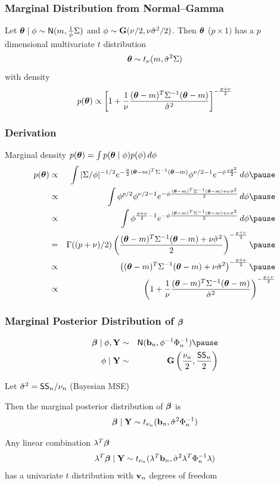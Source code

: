 \documentclass[handout]{beamer}
\begin{document}
\begin{frame}
  \frametitle{Marginal Distribution from Normal--Gamma }
  \begin{theorem}
    Let  $\boldsymbol{\theta} \mid \phi \sim \textsf{N}(m, \frac{1}{\phi} \Sigma)$ and $\phi \sim
    \mathbf{G}(\nu/2, \nu {\hat{\sigma}}^2/2)$. Then  $\boldsymbol{\theta}$ ($p \times 1)$ has a $p$
    dimensional multivariate $t$ distribution $$\boldsymbol{\theta} \sim t_\nu( m,
    {\hat{\sigma}}^2 \Sigma )$$ with density
$$p(\boldsymbol{\theta}) \propto  \left[ 1 + \frac{1}{\nu}  \frac{ (\boldsymbol{\theta} - m)^T
    \Sigma^{-1} (\boldsymbol{\theta} - m)}{{\hat{\sigma}}^2} \right]^{- \frac{p + \nu}{2}}$$
  \end{theorem}
\end{frame}

\begin{frame}
  \frametitle{Derivation}
Marginal density  $p(\boldsymbol{\theta}) = \int p(\boldsymbol{\theta} \mid \phi) p(\phi) \, d\phi$
\pause
\begin{eqnarray*}
  p(\t) & \propto & \int |\Sigma/\phi|^{-1/2} 
e^{- \frac{\phi}{2} (\t - m)^T
    \Sigma^{-1} (\t - m)}  \phi^{\nu/2 - 1} e^{- \phi \frac{\nu
      \shat}{2}}\, d \phi \pause \\
  & \propto & \int \phi^{p/2} \phi^{\nu/2 - 1}
e^{- \phi \frac{(\t - m)^T
    \Sigma^{-1} (\t - m)+  \nu
      \shat}{2}}\, d \phi \pause \\
 & \propto & \int \phi^{\frac{p +\nu}{2} - 1}
e^{- \phi \frac{(\t - m)^T
    \Sigma^{-1} (\t - m)+  \nu
      \shat}{2}} \, d \phi \pause \\
& = & \Gamma((p + \nu)/2 ) \left( \frac{(\t - m)^T
    \Sigma^{-1} (\t - m)+  \nu
      \shat}{2} \right)^{- \frac{p + \nu}{2}} \pause \\
& \propto &  \left( (\t - m)^T
    \Sigma^{-1} (\t - m)+  \nu
      \shat \right)^{- \frac{p + \nu}{2}} \pause \\
& \propto &  \left( 1 + \frac{1}{\nu}  \frac{(\t - m)^T
    \Sigma^{-1} (\t - m)}{\shat}
       \right)^{- \frac{p + \nu}{2}}
\end{eqnarray*}
\end{frame}

\begin{frame}
  \frametitle{Marginal Posterior Distribution of $\boldsymbol{\beta}$}
  \begin{eqnarray*}
\b \mid \phi, \Y  & \sim & \N( \bv_n, \phi^{-1} \Phi_n^{-1}) \pause \\    
 \phi \mid \Y & \sim & \G\left(\frac{\nu_n}{2},  \frac{\SS_n}{ 2} \right) 
  \end{eqnarray*}
\pause

Let ${\hat{\sigma}}^2 = \textsf{SS}_n/\nu_n$  (Bayesian MSE) \pause

Then the marginal posterior distribution of $\boldsymbol{\beta}$ is 
$$
\boldsymbol{\beta}  \mid \mathbf{Y} \sim t_{\nu_n} (\mathbf{b}_n, {\hat{\sigma}}^2 \Phi_n^{-1})
$$ \pause


Any linear combination $\lambda^T\boldsymbol{\beta}$
$$\lambda^T\boldsymbol{\beta}  \mid \mathbf{Y} \sim t_{\nu_n}
(\lambda^T\mathbf{b}_n, {\hat{\sigma}}^2 \lambda^T\Phi_n^{-1}\lambda)$$ has a univariate
$t$ distribution with $\mathbf{v}_n$ degrees of freedom

\end{frame}
\end{document}
